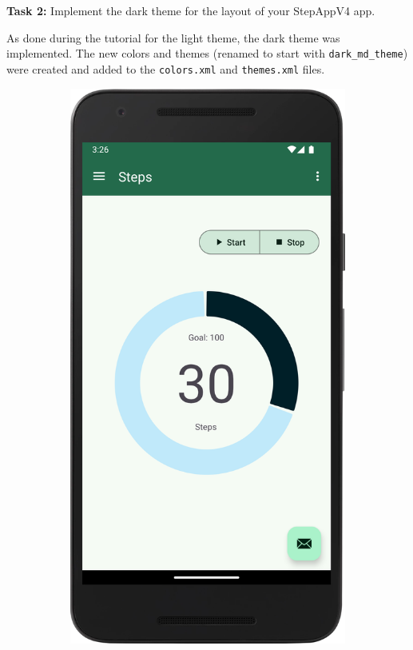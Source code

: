 \documentclass{usireport}
\begin{document}
\textbf{Task 2:} Implement the dark theme for the layout of your StepAppV4 app.

As done during the tutorial for the light theme, the dark theme was implemented. The new colors and themes (renamed to start with \texttt{dark\_md\_theme}) were created and added to the \texttt{colors.xml} and \texttt{themes.xml} files. 

\begin{figure}[H]
    \centering
    \begin{subfigure}[b]{0.3\textwidth}
        \includegraphics[width=\textwidth]{fig/light_mode.png}

\end{subfigure}
\end{figure}
\end{document}
